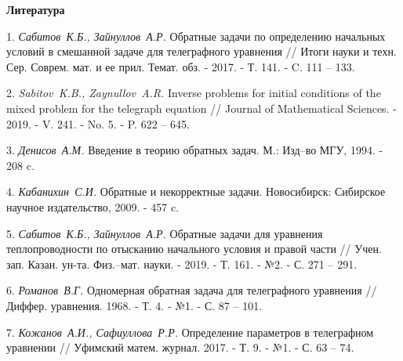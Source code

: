 \documentclass[12pt]{article}
\begin{document}
\begin{center}
{\bf Литература}\end{center}

1. {\it Сабитов~К.Б., Зайнуллов~А.Р.}
 Обратные задачи по определению начальных условий в смешанной задаче для телеграфного уравнения // Итоги науки и техн. Сер. Соврем. мат. и ее прил. Темат. обз. - 2017. - Т. 141. - C. 111 -- 133.

2. {\it Sabitov~K.B., Zaynullov~A.R.} Inverse problems for initial conditions of the mixed problem
 for the telegraph equation // Journal of Mathematical Sciences. - 2019. - V. 241. - No. 5. - P. 622 -- 645.

3. {\it Денисов~А.М.} Введение в теорию обратных задач. М.: Изд--во МГУ, 1994. - 208 c.

4. {\it Кабанихин~С.И.} Обратные и некорректные задачи. Новосибирск: Сибирское научное
 издательство, 2009. - 457 c.

5. {\it Сабитов~К.Б., Зайнуллов~А.Р.} Обратные задачи для уравнения теплопроводности по отысканию
 начального условия и правой части // Учен. зап. Казан. ун-та. Физ.--мат. науки. - 2019. - Т. 161. - №2. - С. 271 -- 291.

6. {\it Романов~В.Г.} Одномерная обратная задача для телеграфного уравнения // Диффер. уравнения.
 1968. - Т. 4. - №1. - С. 87 -- 101.

7. {\it Кожанов~А.И., Сафиуллова~Р.Р.} Определение параметров в телеграфном уравнении // Уфимский
 матем. журнал. 2017. - Т. 9. - №1. - С. 63 -- 74.
\end{document}
